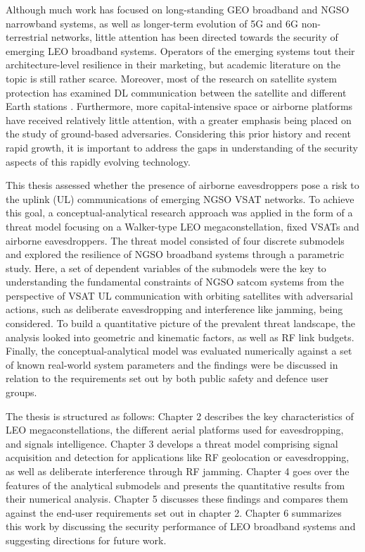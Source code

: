 \documentclass[english, 12pt, a4paper, elec, utf8, a-1b, online]{aaltothesis}
\begin{document}
Although much work has focused on long-standing GEO broadband and NGSO narrowband systems, as well as longer-term evolution of 5G and 6G non-terrestrial networks, little attention has been directed towards the security of emerging LEO broadband systems.
Operators of the emerging systems tout their architecture-level resilience in their marketing, but academic literature on the topic is still rather scarce.
Moreover, most of the research on satellite system protection has examined DL communication between the satellite and different Earth stations \cite{abdelsalam2023physical}.
Furthermore, more capital-intensive space or airborne platforms have received relatively little attention, with a greater emphasis being placed on the study of ground-based adversaries.
Considering this prior history and recent rapid growth, it is important to address the gaps in understanding of the security aspects of this rapidly evolving technology. 

This thesis assessed whether the presence of airborne eavesdroppers pose a risk to the uplink (UL) communications of emerging NGSO VSAT networks.
To achieve this goal, a conceptual-analytical research approach was applied in the form of a threat model focusing on a Walker-type LEO megaconstellation, fixed VSATs and airborne eavesdroppers.
The threat model consisted of four discrete submodels and explored the resilience of NGSO broadband systems through a parametric study.
Here, a set of dependent variables of the submodels were the key to understanding the fundamental constraints of NGSO satcom systems from the perspective of VSAT UL communication with orbiting satellites with adversarial actions, such as deliberate eavesdropping and interference like jamming, being considered.
To build a quantitative picture of the prevalent threat landscape, the analysis looked into geometric and kinematic factors, as well as RF link budgets. 
Finally, the conceptual-analytical model was evaluated numerically against a set of known real-world system parameters and the findings were be discussed in relation to the requirements set out by both public safety and defence user groups.

The thesis is structured as follows:
Chapter 2 describes the key characteristics of LEO megaconstellations, the different aerial platforms used for eavesdropping, and signals intelligence.
Chapter 3 develops a threat model comprising signal acquisition and detection for applications like RF geolocation or eavesdropping, as well as deliberate interference through RF jamming.
Chapter 4 goes over the features of the analytical submodels and presents the quantitative results from their numerical analysis.
Chapter 5 discusses these findings and compares them against the end-user requirements set out in chapter 2.
Chapter 6 summarizes this work by discussing the security performance of LEO broadband systems and suggesting directions for future work.
\end{document}
